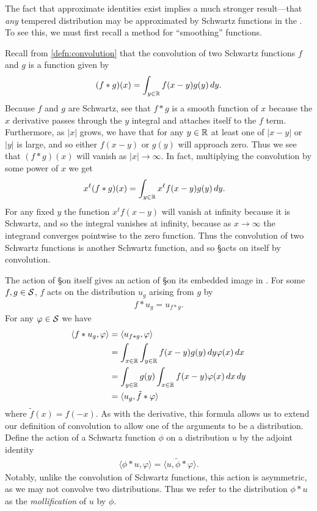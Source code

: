    The fact that approximate identities exist implies a much stronger result---that \emph{any} tempered distribution may be approximated by Schwartz functions in the \ws.
    To see this, we must first recall a method for ``smoothing'' functions.

    Recall from \cref{defn:convolution} that the convolution of two Schwartz functions $f$ and $g$ is a function given by
    \begin{align*}
      (f*g)(x) = \int_{y\in\R} f(x-y)g(y)\,dy \text{.}
    \end{align*}
    Because $f$ and $g$ are Schwartz, see that $f*g$ is a smooth function of $x$ because the $x$ derivative passes through the $y$ integral and attaches itself to the $f$ term.
    Furthermore, as $|x|$ grows, we have that for any $y\in\R$ at least one of $|x-y|$ or $|y|$ is large, and so either $f(x-y)$ or $g(y)$ will approach zero.
    Thus we see that $(f*g)(x)$ will vanish as $|x|\rightarrow\infty$.
    In fact, multiplying the convolution by some power of $x$ we get
    \begin{align*}
      x^\ell(f*g)(x)
      &= \int_{y\in\R} x^\ell f(x-y)g(y)\,dy \text{.}
    \end{align*}
    For any fixed $y$ the function $x^\ell f(x-y)$ will vanish at infinity because it is Schwartz, and so the integral vanishes at infinity, because as $x\rightarrow\infty$ the integrand converges pointwise to the zero function.
    Thus the convolution of two Schwartz functions is another Schwartz function, and so \S acts on itself by convolution.

    The action of \S on itself gives an action of \S on its embedded image in \SS.
    For some $f,g\in\S$, $f$ acts on the distribution $u_g$ arising from $g$ by
    \begin{align*}
      f*u_g = u_{f*g} \text{.}
    \end{align*}
    For any $\varphi\in\S$ we have
    \begin{align*}
      \langle f*u_g, \varphi\rangle
      &= \langle u_{f*g}, \varphi\rangle
      \\&= \int_{x\in\R} \int_{y\in\R} f(x-y)g(y)\,dy \varphi(x)\,dx
      \\&= \int_{y\in\R} g(y) \int_{x\in\R} f(x-y)\varphi(x)\,dx\,dy
      \\&= \langle u_g, \tilde f*\varphi\rangle
    \end{align*}
    where $\tilde f(x) = f(-x)$.
    As with the derivative, this formula allows us to extend our definition of convolution to allow one of the arguments to be a distribution.
    Define the action of a Schwartz function $\phi$ on a distribution $u$ by the adjoint identity
    \begin{align*}
      \langle \phi*u, \varphi\rangle
      = \langle u, \tilde\phi*\varphi\rangle \text{.}
    \end{align*}
    Notably, unlike the convolution of Schwartz functions, this action is asymmetric, as we may not convolve two distributions.
    Thus we refer to the distribution $\phi*u$ as the \emph{mollification} of $u$ by $\phi$.

